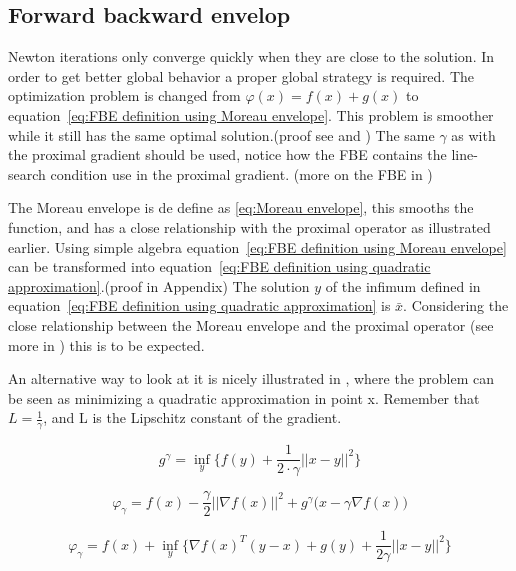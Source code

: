 	\subsection{Forward backward envelop}	
		Newton iterations only converge quickly when they are close to the solution. In order to get better global behavior a proper global strategy is required. The optimization problem is changed from $\varphi(x) = f(x) + g(x)$ to equation~\ref{eq:FBE definition using Moreau envelope}. This problem is smoother while it still has the same optimal solution.(proof see \cite{LorenzoStella2017} and \cite{Themelis}) The same $\gamma$ as with the proximal gradient should be used, notice how the FBE contains the line-search condition use in the proximal gradient. (more on the FBE in \cite{Themelis})
		
		The Moreau envelope is de define as \ref{eq:Moreau envelope}, this smooths the function, and has a close relationship with the proximal operator as illustrated earlier. Using simple algebra equation~\ref{eq:FBE definition using Moreau envelope} can be transformed into equation~\ref{eq:FBE definition using quadratic approximation}.(proof in Appendix) The solution $y$ of the infimum defined in equation~\ref{eq:FBE definition using quadratic approximation} is $\bar{x}$. Considering the close relationship between the Moreau envelope and the proximal operator (see more in \cite{Themelis}) this is to be expected.
		
		An alternative way to look at it is nicely illustrated in \cite{AjaySathya2017}, where the problem can be seen as minimizing a quadratic approximation in point x.  Remember that $L = \frac{1}{\gamma}$, and L is the Lipschitz constant of the gradient.
		
		\begin{equation}
			g^{\gamma} = \underset{y}{\inf} \big \{f(y)+\frac{1}{2 \cdot \gamma}||x-y||^2 \big \}
			\label{eq:Moreau envelope}
		\end{equation}
		
		\begin{equation}
		\varphi_{\gamma} = f(x) - \frac{\gamma}{2}||\nabla f(x)||^2 + g^{\gamma} \big(x-\gamma \nabla f(x) \big)
		\label{eq:FBE definition using Moreau envelope}
		\end{equation}
		
		\begin{equation}
		\varphi_{\gamma} =   f(x) + \underset{y}{\inf} \Big\{ \nabla f(x)^T(y-x) + g(y) + \frac{1}{2 \gamma} ||x-y||^2  \Big\}
		\label{eq:FBE definition using quadratic approximation}
		\end{equation}
		
